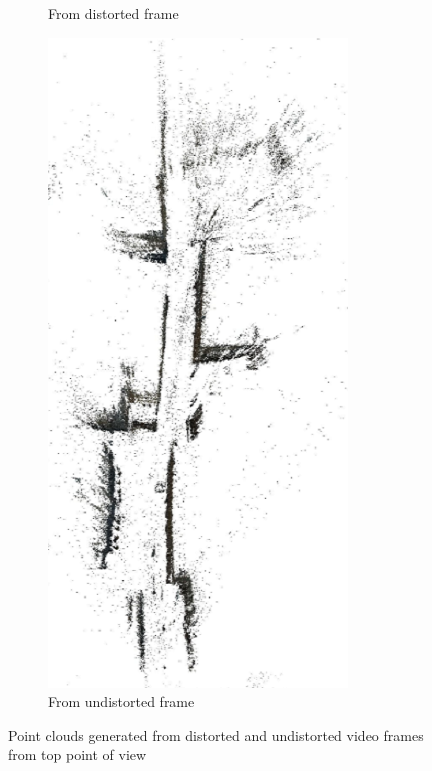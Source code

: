 \documentclass[11pt]{article}
\begin{document}
\begin{figure}
\begin{subfigure}{0.45\textwidth}
            \caption{From distorted frame}
        \end{subfigure}
        \hfill
        \begin{subfigure}{0.45\textwidth}
            \centering
            \includegraphics[width=\linewidth]{images/experiment/ply_undistorted}
            \caption{From undistorted frame}
        \end{subfigure}
        \caption{Point clouds generated from distorted and undistorted video frames from top point of view}
        \label{fig:ply_distorted}
    \end{figure}
\end{document}
